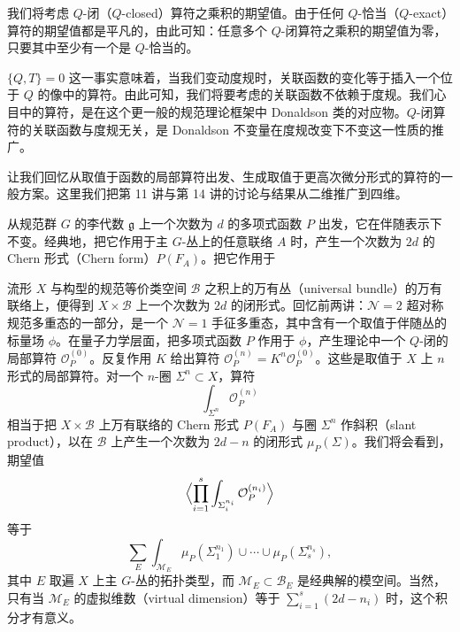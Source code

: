 我们将考虑 $Q$-闭（$Q$-closed）算符之乘积的期望值。由于任何 $Q$-恰当（$Q$-exact）算符的期望值都是平凡的，由此可知：任意多个 $Q$-闭算符之乘积的期望值为零，只要其中至少有一个是 $Q$-恰当的。

$\{Q,T\}=0$ 这一事实意味着，当我们变动度规时，关联函数的变化等于插入一个位于 $Q$ 的像中的算符。由此可知，我们将要考虑的关联函数不依赖于度规。我们心目中的算符，是在这个更一般的规范理论框架中 Donaldson 类的对应物。$Q$-闭算符的关联函数与度规无关，是 Donaldson 不变量在度规改变下不变这一性质的推广。


让我们回忆从取值于函数的局部算符出发、生成取值于更高次微分形式的算符的一般方案。这里我们把第 11 讲与第 14 讲的讨论与结果从二维推广到四维。

从规范群 $G$ 的李代数 $\mathfrak{g}$ 上一个次数为 $d$ 的多项式函数 $P$ 出发，它在伴随表示下不变。经典地，把它作用于主 $G$-丛上的任意联络 $A$ 时，产生一个次数为 $2d$ 的 Chern 形式（Chern form）$P(F_A)$。把它作用于

流形 $X$ 与构型的规范等价类空间 $\mathcal{B}$ 之积上的万有丛（universal bundle）的万有联络上，便得到 $X\times\mathcal{B}$ 上一个次数为 $2d$ 的闭形式。回忆前两讲：$\mathcal{N}=2$ 超对称规范多重态的一部分，是一个 $\mathcal{N}=1$ 手征多重态，其中含有一个取值于伴随丛的标量场 $\phi$。在量子力学层面，把多项式函数 $P$ 作用于 $\phi$，产生理论中一个 $Q$-闭的局部算符 $\mathcal{O}_P^{(0)}$。反复作用 $K$ 给出算符 $\mathcal{O}_P^{(n)}=K^n\mathcal{O}_P^{(0)}$。这些是取值于 $X$ 上 $n$ 形式的局部算符。对一个 $n$-圈 $\Sigma^n\subset X$，算符
\[
\int_{\Sigma^n}\mathcal{O}_P^{(n)}
\]
相当于把 $X\times\mathcal{B}$ 上万有联络的 Chern 形式 $P(F_A)$ 与圈 $\Sigma^n$ 作斜积（slant product），以在 $\mathcal{B}$ 上产生一个次数为 $2d-n$ 的闭形式 $\mu_P(\Sigma)$。我们将会看到，期望值
\[
\Bigl\langle\prod_{i=1}^s\int_{\Sigma_i^{n_i}}\mathcal{O}_P^{(n_i)}\Bigr\rangle
\]
等于
\[
\sum_E\int_{\mathcal{M}_E}\mu_P(\Sigma_1^{n_1})\cup\cdots\cup\mu_P(\Sigma_s^{n_s}),
\]
其中 $E$ 取遍 $X$ 上主 $G$-丛的拓扑类型，而 $\mathcal{M}_E\subset\mathcal{B}_E$ 是经典解的模空间。当然，只有当 $\mathcal{M}_E$ 的虚拟维数（virtual dimension）等于 $\sum_{i=1}^{s}(2d-n_i)$ 时，这个积分才有意义。

